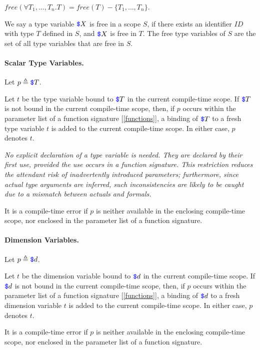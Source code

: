 \documentclass{article}
\begin{document}
 $free(\forall T_1, \ldots, T_n.T) = free(T) - \{T_1, \ldots, T_n\}$.
 
 
 We say a type variable $\texttt{\color{blue} \$}{}X$ is free in a scope $S$, if there exists an identifier $ID$ with type $T$ defined in $S$, and $\texttt{\color{blue} \$}{}X$ is free in $T$. The free type variables of $S$ are the set of all type variables that are free in $S$.

\paragraph{Scalar Type Variables.}
 
 Let $p \triangleq \texttt{\color{blue} \$}{}T$.
 
 Let $t$ be the type variable bound to $\texttt{\color{blue} \$}{}T$ in the current compile-time scope. If $\texttt{\color{blue} \$}{}T$ is not bound in the current compile-time scope, then, if $p$ occurs within  the parameter list of a function signature [\ref{functions}],  a binding of $\texttt{\color{blue} \$}{}T$ to a fresh type variable $t$ is added to the current compile-time scope. In either case, $p$ denotes  $t$. 
 
 {\em 
No explicit declaration of a type variable is needed. They are declared by their first use, provided the use occurs in a function signature. This restriction reduces the attendant risk of inadvertently introduced parameters; furthermore, since
 actual type arguments are inferred, such inconsistencies are likely to be caught due to a mismatch between actuals and formals.
 } 
 
 It is a compile-time error if $p$ is neither available in the enclosing compile-time scope, nor enclosed in the parameter list of a function signature.
 
 \paragraph{Dimension Variables.}
 
 Let $p \triangleq \texttt{\color{blue} \$}{}d$.
 
 Let $t$ be the dimension variable bound to $\texttt{\color{blue} \$}{}d$ in the current compile-time scope. If $\texttt{\color{blue} \$}{}d$ is not bound in the current compile-time scope, then, if $p$ occurs within the parameter list of a function signature [\ref{functions}],  a binding of $\texttt{\color{blue} \$}{}d$ to a fresh dimension variable $t$ is added to the current compile-time scope. In either case, $p$ denotes  $t$. 

 
 It is a compile-time error if $p$ is neither available in the enclosing compile-time scope, nor enclosed in the parameter list of a function signature.
 
\end{document}
